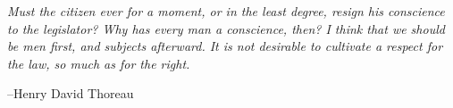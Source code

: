 \documentclass[fleqn]{exam}
\begin{document}
\else

\vspace{4 cm}

{\em Must the citizen ever for a moment, or in the least degree, resign his conscience to the legislator? Why has every
  man a conscience, then? I think that we should be men first, and subjects afterward. It is not desirable to cultivate
  a respect for the law, so much as for the right.}

\vspace{.2 cm}

\hspace{1 cm} --Henry David Thoreau

\fi
\end{document}
